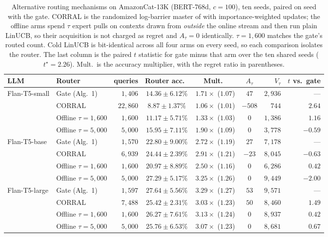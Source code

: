 \documentclass{article}
\theoremstyle{definition}
\theoremstyle{remark}
\theoremstyle{remark}
\begin{document}
\begin{table}[h]
\centering
\caption{Alternative routing mechanisms on AmazonCat-13K (BERT-768d,
$c=100$), ten seeds, paired on seed with the gate. CORRAL is the randomized
log-barrier master of \cite{agarwal2017corralling} with importance-weighted
updates; the offline arms spend $\tau$ expert pulls on contexts drawn from
\emph{outside} the online stream and then run plain LinUCB, so their
acquisition is not charged as regret and $A_\tau=0$ identically.
$\tau=1{,}600$ matches the gate's routed count. Cold LinUCB is bit-identical
across all four arms on every seed, so each comparison isolates the router.
The last column is the paired $t$ statistic for gate minus that arm over the
ten shared seeds ($t^\star=2.26$). Mult.\ is the accuracy multiplier, with
the regret ratio in parentheses.}
\label{tab:baselines}
\small
\setlength{\tabcolsep}{4pt}
\begin{tabular}{@{}llrcccrr@{}}
\toprule
LLM & Router & queries & Router acc.\ & Mult.\ & $A_\tau$ & $V_\tau$ & $t$ vs.\ gate \\
\midrule
\multirow{4}{*}{Flan-T5-small}
 & Gate (Alg.\ 1)    & $1{,}406$  & $14.36\pm6.12\%$ & $1.71\times$ ($1.07$) & $47$   & $2{,}936$ & --- \\
 & CORRAL            & $22{,}860$ & $8.87\pm1.37\%$  & $1.06\times$ ($1.01$) & $-508$ & $744$     & $\mathbf{2.64}$ \\
 & Offline $\tau{=}1{,}600$ & $1{,}600$ & $11.17\pm5.71\%$ & $1.33\times$ ($1.03$) & $0$ & $1{,}386$ & $1.16$ \\
 & Offline $\tau{=}5{,}000$ & $5{,}000$ & $15.95\pm7.11\%$ & $1.90\times$ ($1.09$) & $0$ & $3{,}778$ & $-0.59$ \\
\midrule
\multirow{4}{*}{Flan-T5-base}
 & Gate (Alg.\ 1)    & $1{,}570$ & $22.80\pm9.00\%$ & $2.72\times$ ($1.19$) & $27$  & $7{,}178$ & --- \\
 & CORRAL            & $6{,}939$ & $24.44\pm2.39\%$ & $2.91\times$ ($1.21$) & $-23$ & $8{,}045$ & $-0.63$ \\
 & Offline $\tau{=}1{,}600$ & $1{,}600$ & $20.97\pm8.89\%$ & $2.50\times$ ($1.16$) & $0$ & $6{,}286$ & $0.42$ \\
 & Offline $\tau{=}5{,}000$ & $5{,}000$ & $27.29\pm5.17\%$ & $3.25\times$ ($1.26$) & $0$ & $9{,}449$ & $-2.00$ \\
\midrule
\multirow{4}{*}{Flan-T5-large}
 & Gate (Alg.\ 1)    & $1{,}597$ & $27.64\pm5.56\%$ & $3.29\times$ ($1.27$) & $53$ & $9{,}571$ & --- \\
 & CORRAL            & $7{,}488$ & $25.42\pm2.31\%$ & $3.03\times$ ($1.23$) & $50$ & $8{,}460$ & $1.49$ \\
 & Offline $\tau{=}1{,}600$ & $1{,}600$ & $26.27\pm7.61\%$ & $3.13\times$ ($1.24$) & $0$ & $8{,}937$ & $0.42$ \\
 & Offline $\tau{=}5{,}000$ & $5{,}000$ & $25.76\pm6.53\%$ & $3.07\times$ ($1.23$) & $0$ & $8{,}681$ & $0.67$ \\
\bottomrule
\end{tabular}
\end{table}
\end{document}
